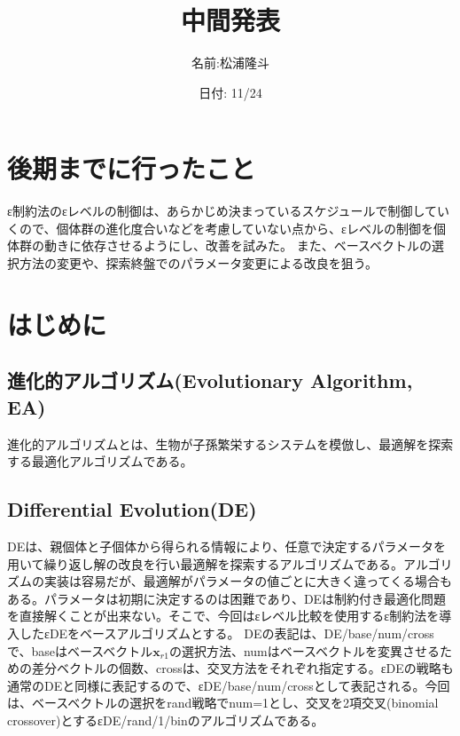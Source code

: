 \documentclass[twocolumn,10pt]{jarticle}
\title{中間発表}
\author{名前:松浦隆斗}
\date{日付: 11/24}
\begin{document}
\maketitle

\section{後期までに行ったこと}
ε制約法のεレベルの制御は、あらかじめ決まっているスケジュールで制御していくので、個体群の進化度合いなどを考慮していない点から、εレベルの制御を個体群の動きに依存させるようにし、改善を試みた。
また、ベースベクトルの選択方法の変更や、探索終盤でのパラメータ変更による改良を狙う。

\section{はじめに}
\subsection{進化的アルゴリズム(Evolutionary Algorithm, EA)}
進化的アルゴリズムとは、生物が子孫繁栄するシステムを模倣し、最適解を探索する最適化アルゴリズムである。

\subsection{Differential Evolution(DE)}
DEは、親個体と子個体から得られる情報により、任意で決定するパラメータを用いて繰り返し解の改良を行い最適解を探索するアルゴリズムである。アルゴリズムの実装は容易だが、最適解がパラメータの値ごとに大きく違ってくる場合もある。パラメータは初期に決定するのは困難であり、DEは制約付き最適化問題を直接解くことが出来ない。そこで、今回はεレベル比較を使用するε制約法を導入したεDEをベースアルゴリズムとする。
DEの表記は、DE/base/num/crossで、baseはベースベクトル$\bm{x}_{r1}$の選択方法、numはベースベクトルを変異させるための差分ベクトルの個数、crossは、交叉方法をそれぞれ指定する。εDEの戦略も通常のDEと同様に表記するので、εDE/base/num/crossとして表記される。今回は、ベースベクトルの選択をrand戦略でnum=1とし、交叉を2項交叉(binomial crossover)とするεDE/rand/1/binのアルゴリズムである。
\end{document}
